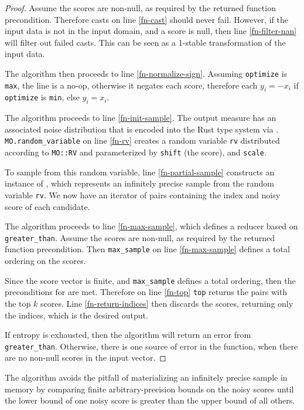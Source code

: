 \documentclass{article}
\begin{document}
\begin{proof}
    Assume the scores are non-null, as required by the returned function precondition.
    Therefore casts on line \ref{fn-cast} should never fail.
    However, if the input data is not in the input domain, and a score is null,
    then line \ref{fn-filter-nan} will filter out failed casts.
    This can be seen as a 1-stable transformation of the input data.

    The algorithm then proceeds to line \ref{fn-normalize-sign}.
    Assuming \texttt{optimize} is \texttt{max}, the line is a no-op, otherwise it negates each score,
    therefore each $y_i = -x_i$ if \texttt{optimize} is \texttt{min}, else $y_i = x_i$.

    The algorithm proceeds to line \ref{fn-init-sample}.
    The output measure has an associated noise distribution that is encoded into the Rust type system via
    .
    \texttt{MO.random\_variable} on line \ref{fn-rv} creates a random variable \texttt{rv} 
    distributed according to \texttt{MO::RV} and parameterized by \texttt{shift} (the score), and \texttt{scale}.

    To sample from this random variable, line \ref{fn-partial-sample} constructs an instance of 
    , 
    which represents an infinitely precise sample from the random variable \texttt{rv}.
    We now have an iterator of pairs containing the index and noisy score of each candidate.

    The algorithm proceeds to line \ref{fn-max-sample},
    which defines a reducer based on \texttt{greater\_than}.
    Assume the scores are non-null, as required by the returned function precondition.
    Then \texttt{max\_sample} on line \ref{fn-max-sample} defines a total ordering on the scores.

    Since the score vector is finite, and \texttt{max\_sample} defines a total ordering,
    then the preconditions for  are met.
    Therefore on line \ref{fn-top} \texttt{top} returns the pairs with the top $k$ scores.
    Line \ref{fn-return-indices} then discards the scores, returning only the indices,
    which is the desired output.

    If entropy is exhausted, then the algorithm will return an error from \texttt{greater\_than}.
    Otherwise, there is one source of error in the function,
    when there are no non-null scores in the input vector.
\end{proof}

The algorithm avoids the pitfall of materializing an infinitely precise sample in memory by comparing finite arbitrary-precision bounds 
on the noisy scores until the lower bound of one noisy score is greater than the upper bound of all others.
\end{document}

